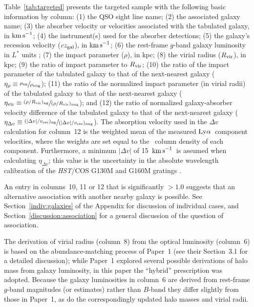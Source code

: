 \documentclass[twocolumn,twocolappendix,tighten,times]{aastex6}
\newcommand{\HI}{\ion{H}{1}}
\newcommand{\hst}{{\sl HST}}
\newcommand{\kms}{\ensuremath{{\rm km\,s}^{-1}}}
\newcommand{\lya}{\ensuremath{{\rm Ly}\alpha}}
\begin{document}
Table~\ref{tab:targeted} presents the targeted sample with the following 
basic information by column: (1) the QSO sight line name; (2) the associated 
galaxy name; (3) the absorber velocity or velocities associated with the  
tabulated galaxy, in \kms; (4) the instrument(s) used for the absorber 
detections; (5) the  galaxy's recession velocity ($cz_{\rm gal}$), in \kms; 
(6) the rest-frame $g$-band galaxy luminosity in $L^*$ units 
; 
(7) the impact parameter ($\rho$), in kpc; (8) the virial radius 
($R_{\rm vir}$), in kpc; (9) the ratio of impact parameter to $R_{\rm vir}$; 
(10) the ratio of the impact parameter of the tabulated galaxy to that of the 
next-nearest galaxy 
($\eta_{\rho} \equiv \sfrac{\rho_{\rm ng}}{\rho_{\rm nng}}$); 
(11) the ratio of the normalized impact parameter (in virial radii) of the 
tabulated galaxy to that of the next-nearest galaxy 
($\eta_{\rm vir} \equiv \sfrac{(\rho/R_{\rm vir})_{\rm ng}}{(\rho/R_{\rm vir})_{\rm nng}}$); 
and (12) the ratio of normalized galaxy-absorber velocity difference of the 
tabulated galaxy to that of the next-nearest galaxy 
($\eta_{\Delta v} \equiv \sfrac{(|\Delta v|/v_{\rm esc})_{\rm ng}}{(|\Delta v|/v_{\rm esc})_{\rm nng}}$). 
The absorption velocity used in the $\Delta v$ calculation for column~12 is the 
weighted mean of the measured \lya\ component velocities, where the weights are 
set equal to the \HI\ column density of each component. Furthermore, a minimum 
$|\Delta v|$ of 15~\kms\ is assumed when calculating $\eta_{\Delta v}$; this 
value is the uncertainty in the absolute wavelength calibration of the \hst/COS 
G130M and G160M gratings \citep{green12}.

An entry in columns~10, 11 or 12 that is significantly $>1.0$ suggests that 
an alternative association with another nearby galaxy is possible. See 
Section~\ref{indiv:galaxies} of the Appendix for discussion of individual cases, 
and Section~\ref{discussion:association} for a general discussion of the question 
of association.

The derivation of virial radius (column~8) from the optical luminosity (column~6) 
is based on the abundance-matching process of Paper~1 (see their Section~3.1 for 
a detailed discussion); while Paper~1 explored several possible derivations of 
halo mass from galaxy luminosity, in this paper the ``hybrid'' prescription was 
adopted.  Because the galaxy luminosities in column~6 are derived from 
rest-frame $g$-band magnitudes (or estimates) rather than $B$-band they differ
slightly from those in Paper~1, as do the correspondingly updated halo
masses and virial radii.
\end{document}

